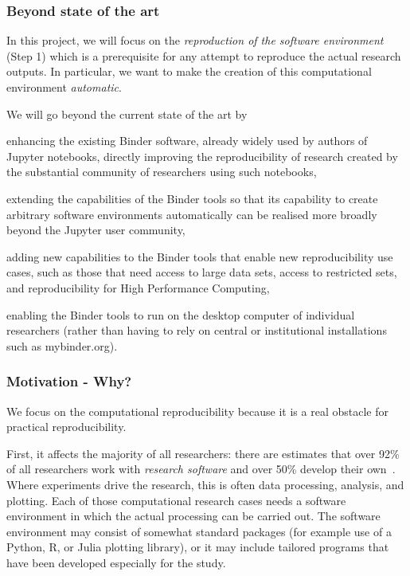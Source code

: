\subsubsection{Beyond state of the art}

In this project, we will focus on the \emph{reproduction of the
  software environment} (Step 1) which is a prerequisite for any attempt to
reproduce the actual research outputs. In particular, we want to make the
creation of this computational environment \emph{automatic}.

We will go beyond the current state of the art by
\begin{compactitem}
\item enhancing the existing Binder software, already widely used by authors of Jupyter notebooks,
  directly improving the reproducibility of research created by the substantial
  community of researchers using such notebooks,
\item extending the capabilities of the Binder tools so that its capability to
  create arbitrary software environments automatically can be realised more broadly beyond the
  Jupyter user community,
\item adding new capabilities to the Binder tools that enable new reproducibility
  use cases, such as those that need access to large data sets, access to restricted sets,
  and reproducibility for High Performance Computing,
\item enabling the Binder tools to run on the desktop computer of individual
  researchers (rather than having to rely on central or institutional
  installations such as mybinder.org).
\end{compactitem}

\subsubsection{Motivation - Why?}\label{sec:motivation-why}

We focus on the computational reproducibility because it is a real
obstacle for practical reproducibility.

First, it affects the majority of all researchers: there are estimates that over 92\%
of all researchers work with \emph{research software} and over 50\% develop
their own~\cite{Hettrick2014}. Where experiments drive the research, this is
often data processing, analysis, and plotting. Each of those computational
research cases needs a software environment in which the actual processing can
be carried out. The software environment may consist of somewhat standard packages (for example
use of a Python, R, or Julia plotting library), or it may include tailored
programs that have been developed especially for the study.

